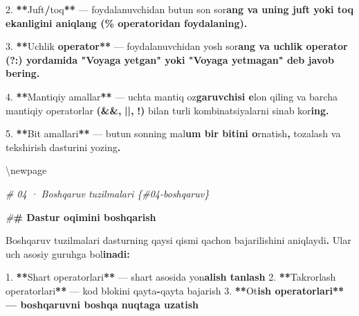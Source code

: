 \documentclass[a4paper,11pt,twoside,openright]{book}
\newenvironment{Shaded}{\begin{snugshade}}{\end{snugshade}}
\newcommand{\CharTok}[1]{\textcolor[rgb]{0.31,0.60,0.02}{#1}}
\newcommand{\ErrorTok}[1]{\textcolor[rgb]{0.64,0.00,0.00}{\textbf{#1}}}
\newcommand{\FloatTok}[1]{\textcolor[rgb]{0.00,0.00,0.81}{#1}}
\newcommand{\KeywordTok}[1]{\textcolor[rgb]{0.13,0.29,0.53}{\textbf{#1}}}
\newcommand{\NormalTok}[1]{#1}
\newcommand{\OperatorTok}[1]{\textcolor[rgb]{0.81,0.36,0.00}{\textbf{#1}}}
\newcommand{\PreprocessorTok}[1]{\textcolor[rgb]{0.56,0.35,0.01}{\textit{#1}}}
\begin{document}
\begin{Shaded}
\begin{Highlighting}[]
\FloatTok{2.} \OperatorTok{**}\NormalTok{Juft}\OperatorTok{/}\NormalTok{toq}\OperatorTok{**}\NormalTok{ — foydalanuvchidan butun son so}\CharTok{\textquotesingle{}r}\ErrorTok{ang va uning juft yoki toq ekanligini aniqlang (\textasciigrave{}\%\textasciigrave{} operatoridan foydalaning).}

\FloatTok{3.} \OperatorTok{**}\NormalTok{Uchlik }\KeywordTok{operator}\OperatorTok{**}\NormalTok{ — foydalanuvchidan yosh so}\CharTok{\textquotesingle{}r}\ErrorTok{ang va uchlik operator (\textasciigrave{}?:\textasciigrave{}) yordamida "Voyaga yetgan" yoki "Voyaga yetmagan" deb javob bering.}

\FloatTok{4.} \OperatorTok{**}\NormalTok{Mantiqiy amallar}\OperatorTok{**}\NormalTok{ — uchta }\ErrorTok{\textasciigrave{}}\NormalTok{mantiq}\ErrorTok{\textasciigrave{}}\NormalTok{ o}\CharTok{\textquotesingle{}z}\ErrorTok{garuvchisi e}\CharTok{\textquotesingle{}}\NormalTok{lon qiling va barcha mantiqiy operatorlar }\OperatorTok{(}\ErrorTok{\textasciigrave{}}\OperatorTok{\&\&}\ErrorTok{\textasciigrave{}}\OperatorTok{,} \ErrorTok{\textasciigrave{}}\OperatorTok{||}\ErrorTok{\textasciigrave{}}\OperatorTok{,} \ErrorTok{\textasciigrave{}}\OperatorTok{!}\ErrorTok{\textasciigrave{}}\OperatorTok{)}\NormalTok{ bilan turli kombinatsiyalarni sinab ko}\CharTok{\textquotesingle{}r}\ErrorTok{ing.}

\FloatTok{5.} \OperatorTok{**}\NormalTok{Bit amallari}\OperatorTok{**}\NormalTok{ — butun sonning ma}\CharTok{\textquotesingle{}l}\ErrorTok{um bir bitini o}\CharTok{\textquotesingle{}}\NormalTok{rnatish}\OperatorTok{,}\NormalTok{ tozalash va tekshirish dasturini yozing}\OperatorTok{.}


\NormalTok{\textbackslash{}newpage}

\PreprocessorTok{\# 04 · Boshqaruv tuzilmalari \{\#04{-}boshqaruv\}}

\PreprocessorTok{\#}\ErrorTok{\# Dastur oqimini boshqarish}

\NormalTok{Boshqaruv tuzilmalari dasturning qaysi qismi qachon bajarilishini aniqlaydi}\OperatorTok{.}\NormalTok{ Ular uch asosiy guruhga bo}\CharTok{\textquotesingle{}l}\ErrorTok{inadi:}

\FloatTok{1.} \OperatorTok{**}\NormalTok{Shart operatorlari}\OperatorTok{**}\NormalTok{ — shart asosida yo}\CharTok{\textquotesingle{}n}\ErrorTok{alish tanlash}
\FloatTok{2.} \OperatorTok{**}\NormalTok{Takrorlash operatorlari}\OperatorTok{**}\NormalTok{ — kod blokini qayta}\OperatorTok{{-}}\NormalTok{qayta bajarish}
\FloatTok{3.} \OperatorTok{**}\NormalTok{O}\CharTok{\textquotesingle{}t}\ErrorTok{ish operatorlari** — boshqaruvni boshqa nuqtaga uzatish}


\end{Highlighting}
\end{Shaded}
\end{document}
